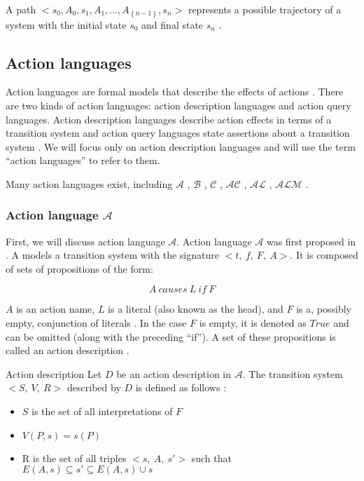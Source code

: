 A path $ <s_0, A_0, s_1, A_1, \ldots, A_{\left\{n-1\right\}}, s_n> $ represents a possible trajectory of a system with the initial state $ s_0 $ and final state $ s_n $ \cite{blount_architecture_2013}.

\subsection{Action languages}
\label{subsec:action_languages}

Action languages are formal models that describe the effects of actions \cite{gelfond_action_1998}.
There are two kinds of action languages: action description languages and action query languages.
Action description languages describe action effects in terms of a transition system and action query languages state assertions about a transition system \cite{gelfond_action_1998}.
We will focus only on action description languages and will use the term ``action languages'' to refer to them.

Many action languages exist, including $ \mathcal{A} $ \cite{gelfond_action_1998}, $ \mathcal{B} $ \cite{gelfond_action_1998}, $ \mathcal{C} $ \cite{gelfond_action_1998}, $ \mathcal{AC} $ \cite{turner_representing_1997}, $ \mathcal{AL} $ \cite{baral_reasoning_2000}, $ \mathcal{ALM} $ \cite{inclezan_modular_2016}.

\subsubsection{Action language $ \mathcal{A} $}
\label{subsubsec:action_language_a}

First, we will discuss action language $ \mathcal{A} $.
Action language $ \mathcal{A} $ was first proposed in \cite{pednault_formulating_1987}.
A models a transition system with the signature $ <{t,\ f},\ F,\ A> $.
It is composed of sets of propositions of the form:

$$
A\ causes\ L\ if\ F
$$

$ A $ is an action name, $ L $ is a literal (also known as the head), and $ F $ is a, possibly empty, conjunction of literals \cite{gelfond_action_1998}.
In the case $ F $ is empty, it is denoted as $ True $ and can be omitted (along with the preceding ``if'').
A set of these propositions is called an action description \cite{gelfond_action_1998}.

\begin{definition}{Action description}
    Let $ D $ be an action description in $ \mathcal{A} $.
    The transition system $ <S,\ V,\ R> $ described by $ D $ is defined as follows \cite{gelfond_action_1998}:

    \begin{itemize}
        \item $ S $ is the set of all interpretations of $ F $
        \item $ V(P, s) = s(P) $
        \item R is the set of all triples $ <s,\ A,\ s'> $ such that $ E(A,s) \subseteq s' \subseteq E(A,s) \cup s $
    \end{itemize}
\end{definition}

